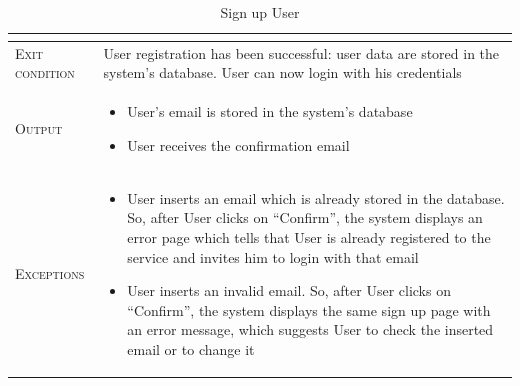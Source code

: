 \begin{table}[H]
\begin{tabular}[c]{|l|p{}|}
\begin{itemize}
                                        \end{itemize}\\
        \hline %
        \textsc{Exit condition}    &  User registration has been successful: user data are stored in the system’s database. User can now login with his credentials\\
    	\hline %
    	\textsc{Output}             &  \begin{itemize}
    	    \item User’s email is stored in the system’s database
            \item User receives the confirmation email

    	\end{itemize}\\
    	\hline %
    	\textsc{Exceptions}         &  \begin{itemize}
    	    \item User inserts an email which is already stored in the database. So, after User clicks on “Confirm”, the system displays an error page which tells that User is already registered to the service and invites him to login with that email
            \item User inserts an invalid email. So, after User clicks on “Confirm”, the system displays the same sign up page with an error message, which suggests User to check the inserted email or to change it

    	\end{itemize}\\
    	\hline %
        
    \end{tabular}
    \caption{\label{tab:user_sign_up}Sign up User}
\end{table}
\newpage
